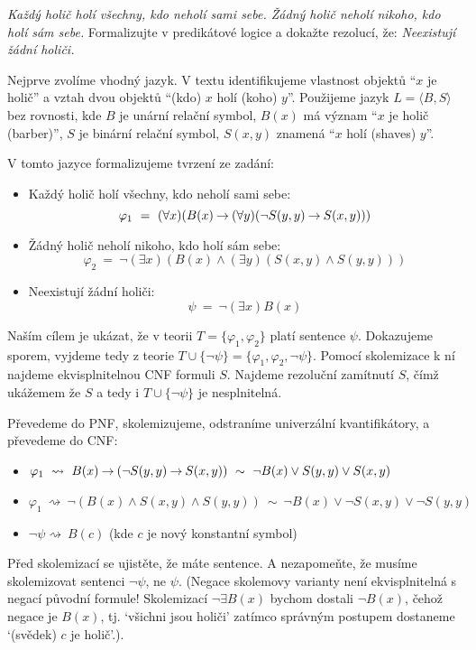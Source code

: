 \begin{problem} 
    
    \emph{Každý holič holí všechny, kdo neholí sami sebe. Žádný holič neholí nikoho, kdo holí sám sebe.} Formalizujte v predikátové logice a dokažte rezolucí, že: \emph{Neexistují žádní holiči.}

    \begin{solution}

        Nejprve zvolíme vhodný jazyk. V textu identifikujeme vlastnost objektů ``$x$ je holič'' a vztah dvou objektů ``(kdo) $x$ holí (koho) $y$''. Použijeme jazyk $L=\langle B, S\rangle$ bez rovnosti, kde $B$ je unární relační symbol, $B(x)$ má význam ``$x$ je holič (barber)'', $S$ je binární relační symbol, $S(x,y)$ znamená ``$x$ holí (shaves) $y$''. 
        
        V tomto jazyce formalizujeme tvrzení ze zadání:
        \begin{itemize}
            \item Každý holič holí všechny, kdo neholí sami sebe: 
            $$
            \varphi_1\ =\ (\forall x)(B(x)\mathbin{\rightarrow} (\forall y)(\neg S(y,y)\mathbin{\rightarrow} S(x,y)))
            $$
            \item Žádný holič neholí nikoho, kdo holí sám sebe: 
            $$
            \varphi_2\ =\ \neg (\exists x)(B(x) \land (\exists y)(S(x,y)\land S(y,y)))
            $$
            \item Neexistují žádní holiči:
            $$
            \psi\ =\ \neg (\exists x)B(x)
            $$
        \end{itemize}
        Naším cílem je ukázat, že v teorii $T=\{\varphi_1,\varphi_2\}$ platí sentence $\psi$. Dokazujeme sporem, vyjdeme tedy z teorie $T\cup\{\neg\psi\}=\{\varphi_1,\varphi_2,\neg\psi\}$. Pomocí skolemizace k ní najdeme ekvisplnitelnou CNF formuli $S$. Najdeme rezoluční zamítnutí $S$, čímž ukážemem že $S$ a tedy i $T\cup\{\neg\psi\}$ je nesplnitelná.

        Převedeme do PNF, skolemizujeme, odstraníme univerzální kvantifikátory, a převedeme do CNF:
        \begin{itemize}
            \item $\varphi_1\ \rightsquigarrow\ B(x)\limplies (\neg S(y,y)\limplies S(x,y))\ \sim \ \neg B(x)\lor S(y,y)\lor S(x,y)$
            \item $\varphi_1\ \rightsquigarrow\ \neg(B(x)\land S(x,y)\land S(y,y))\ \sim\ \neg B(x)\lor \neg S(x,y)\lor \neg S(y,y)$
            \item $\neg\psi\rightsquigarrow\ B(c)$ (kde $c$ je nový konstantní symbol)
        \end{itemize}
        Před skolemizací se ujistěte, že máte sentence. A nezapomeňte, že musíme skolemizovat sentenci $\neg\psi$, ne $\psi$. (Negace skolemovy varianty není ekvisplnitelná s negací původní formule! Skolemizací $\neg\exists B(x)$ bychom dostali $\neg B(x)$, čehož negace je $B(x)$, tj. `všichni jsou holiči' zatímco správným postupem dostaneme `(svědek) $c$ je holič'.). 
        

\end{solution}
\end{problem}
